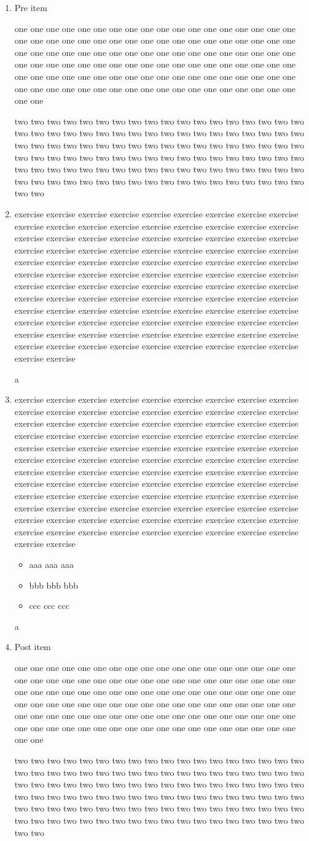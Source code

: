 \documentclass{article}
\newenvironment{excopy}
{\item %
 \begin{list}{}{
 \setlength{\topsep}{0pt}
 \setlength{\partopsep}{0pt}
 \setlength{\itemsep}{0pt}
 \setlength{\leftmargin}{0pt}
 \setlength{\rightmargin}{20pt}
 \setlength{\listparindent}{0pt}
 \setlength{\itemindent}{0pt}
 \setlength{\labelsep}{0pt}
 \setlength{\labelwidth}{0pt}
 \footnotesize
 }
}
{%
 \par
 {\nullfont a}\hrulefill
 \end{list}
}
\begin{document}
\newcommand{\many}[1]{
#1 #1 #1 #1 #1 #1 #1 #1 #1 #1 #1 #1 #1 #1 #1 #1 #1 #1 #1 #1 #1 #1 #1
  #1 #1 #1 #1 #1 #1 #1 #1 #1 #1 #1 #1 #1 #1 #1 #1 #1 #1 #1 #1 #1 #1 #1
  #1 #1 #1 #1 #1 #1 #1 #1 #1 #1 #1 #1 #1 #1 #1 #1 #1 #1 #1 #1 #1 #1 #1
  #1 #1 #1 #1 #1 #1 #1 #1 #1 #1 #1 #1 #1 #1 #1 #1 #1 #1 #1 #1 #1 #1 #1
  #1 #1 #1 #1 #1 #1 #1 #1 #1 #1 #1 #1 #1 #1 #1 #1 #1 #1
}


\newcommand{\pone}{\many{one}}
\newcommand{\ptwo}{\many{two}}
\newcommand{\pthree}{\many{three}}
\newcommand{\pfour}{\many{four}}
\newcommand{\pex}{\many{exercise}}

\newcommand{\paras}{\pone\par\ptwo\par\pthree\par\pfour}


\begin{enumerate}

\item Pre item
\pone\par\ptwo

\begin{excopy}
\pex
\end{excopy}

\begin{excopy}
\pex
\begin{itemize}
\item[A] aaa aaa aaa
\item[B] bbb bbb bbb
\item[C] ccc ccc ccc
\end{itemize}
\end{excopy}

\item Post item
\pone\par\ptwo

\end{enumerate}
\end{document}
